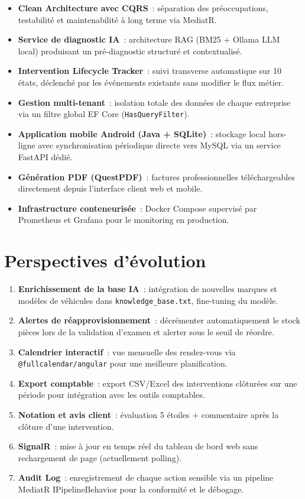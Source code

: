 \begin{itemize}[noitemsep,leftmargin=1.5em]
  \item \textbf{Clean Architecture avec CQRS}~: séparation des préoccupations,
    testabilité et maintenabilité à long terme via MediatR.
  \item \textbf{Service de diagnostic IA}~: architecture RAG (BM25 + Ollama LLM local)
    produisant un pré-diagnostic structuré et contextualisé.
  \item \textbf{Intervention Lifecycle Tracker}~: suivi transverse automatique sur
    10 états, déclenché par les événements existants sans modifier le flux métier.
  \item \textbf{Gestion multi-tenant}~: isolation totale des données de chaque
    entreprise via un filtre global EF Core (\texttt{HasQueryFilter}).
  \item \textbf{Application mobile Android (Java + SQLite)}~: stockage local hors-ligne
    avec synchronisation périodique directe vers MySQL via un service FastAPI dédié.
  \item \textbf{Génération PDF (QuestPDF)}~: factures professionnelles téléchargeables
    directement depuis l'interface client web et mobile.
  \item \textbf{Infrastructure conteneurisée}~: Docker Compose supervisé par
    Prometheus et Grafana pour le monitoring en production.
\end{itemize}

\section*{Perspectives d'évolution}

\begin{enumerate}[noitemsep,leftmargin=1.5em]
  \item \textbf{Enrichissement de la base IA}~: intégration de nouvelles marques et
    modèles de véhicules dans \texttt{knowledge\_base.txt}, fine-tuning du modèle.
  \item \textbf{Alertes de réapprovisionnement}~: décrémenter automatiquement le stock
    pièces lors de la validation d'examen et alerter sous le seuil de réordre.
  \item \textbf{Calendrier interactif}~: vue mensuelle des rendez-vous via
    \texttt{@fullcalendar/angular} pour une meilleure planification.
  \item \textbf{Export comptable}~: export CSV/Excel des interventions clôturées
    sur une période pour intégration avec les outils comptables.
  \item \textbf{Notation et avis client}~: évaluation 5 étoiles + commentaire
    après la clôture d'une intervention.
  \item \textbf{SignalR}~: mise à jour en temps réel du tableau de bord web sans
    rechargement de page (actuellement polling).
  \item \textbf{Audit Log}~: enregistrement de chaque action sensible via un
    pipeline MediatR IPipelineBehavior pour la conformité et le débogage.
\end{enumerate}

